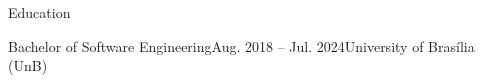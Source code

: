 \documentclass{resume} %
\begin{document}
\begin{rSection}{Education}

\begin{rSubsection}{Bachelor of Software Engineering}{Aug. 2018 -- Jul. 2024}{University of Brasília (UnB)}{}
\vspace{-.65cm}
\item[]
\end{rSubsection}
\end{rSection}





\end{document}
